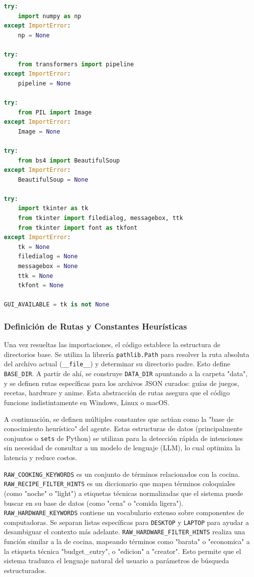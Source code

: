 \documentclass[letterpaper,12pt]{article}
\begin{document}
\begin{lstlisting}[language=Python,basicstyle=\scriptsize\ttfamily, caption=Importaciones y Configuración de Entorno]
try:
    import numpy as np
except ImportError:
    np = None

try:
    from transformers import pipeline
except ImportError:
    pipeline = None

try:
    from PIL import Image
except ImportError:
    Image = None

try:
    from bs4 import BeautifulSoup
except ImportError:
    BeautifulSoup = None

try:
    import tkinter as tk
    from tkinter import filedialog, messagebox, ttk
    from tkinter import font as tkfont
except ImportError:
    tk = None
    filedialog = None
    messagebox = None
    ttk = None
    tkfont = None

GUI_AVAILABLE = tk is not None
\end{lstlisting}

\subsubsection{Definición de Rutas y Constantes Heurísticas}

Una vez resueltas las importaciones, el código establece la estructura de directorios base. Se utiliza la librería \texttt{pathlib.Path} para resolver la ruta absoluta del archivo actual (\texttt{\_\_file\_\_}) y determinar su directorio padre. Esto define \texttt{BASE\_DIR}. A partir de ahí, se construye \texttt{DATA\_DIR} apuntando a la carpeta "data", y se definen rutas específicas para los archivos JSON curados: guías de juegos, recetas, hardware y anime. Esta abstracción de rutas asegura que el código funcione indistintamente en Windows, Linux o macOS.

A continuación, se definen múltiples constantes que actúan como la "base de conocimiento heurístico" del agente. Estas estructuras de datos (principalmente conjuntos o \texttt{sets} de Python) se utilizan para la detección rápida de intenciones sin necesidad de consultar a un modelo de lenguaje (LLM), lo cual optimiza la latencia y reduce costos.

\texttt{RAW\_COOKING\_KEYWORDS} es un conjunto de términos relacionados con la cocina.
\texttt{RAW\_RECIPE\_FILTER\_HINTS} es un diccionario que mapea términos coloquiales (como "noche" o "light") a etiquetas técnicas normalizadas que el sistema puede buscar en su base de datos (como "cena" o "comida ligera").
\texttt{RAW\_HARDWARE\_KEYWORDS} contiene un vocabulario extenso sobre componentes de computadoras. Se separan listas específicas para \texttt{DESKTOP} y \texttt{LAPTOP} para ayudar a desambiguar el contexto más adelante.
\texttt{RAW\_HARDWARE\_FILTER\_HINTS} realiza una función similar a la de cocina, mapeando términos como "barata" o "economica" a la etiqueta técnica "budget\_entry", o "edicion" a "creator". Esto permite que el sistema traduzca el lenguaje natural del usuario a parámetros de búsqueda estructurados.
\end{document}
